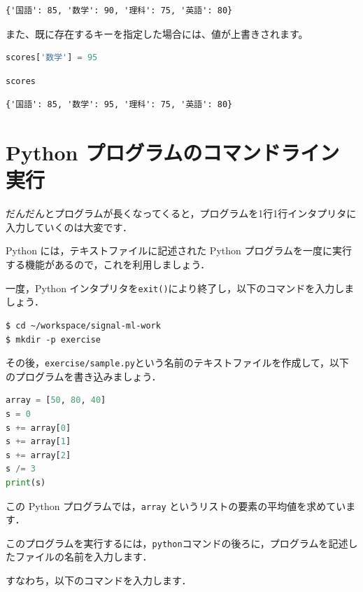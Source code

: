 \begin{lstlisting}[style=outputcell]
{'国語': 85, '数学': 90, '理科': 75, '英語': 80}
\end{lstlisting}

また、既に存在するキーを指定した場合には、値が上書きされます。


\begin{lstlisting}[style=codecell,language=Python]
scores['数学'] = 95
\end{lstlisting}

\begin{lstlisting}[style=codecell,language=Python]
scores
\end{lstlisting}

\begin{lstlisting}[style=outputcell]
{'国語': 85, '数学': 95, '理科': 75, '英語': 80}
\end{lstlisting}

\section{Python プログラムのコマンドライン実行}

だんだんとプログラムが長くなってくると，プログラムを1行1行インタプリタに入力していくのは大変です．

Python には，テキストファイルに記述された Python プログラムを一度に実行する機能があるので，これを利用しましょう．


一度，Python インタプリタを\texttt{exit()}により終了し，以下のコマンドを入力しましょう．

\begin{lstlisting}[style=codecell]
$ cd ~/workspace/signal-ml-work
$ mkdir -p exercise
\end{lstlisting}


その後，\texttt{exercise/sample.py}という名前のテキストファイルを作成して，以下のプログラムを書き込みましょう．


\begin{lstlisting}[style=codecell,language=Python]
array = [50, 80, 40]
s = 0
s += array[0]
s += array[1]
s += array[2]
s /= 3
print(s)
\end{lstlisting}

この Python プログラムでは，\texttt{array} というリストの要素の平均値を求めています．

このプログラムを実行するには，\texttt{python}コマンドの後ろに，プログラムを記述したファイルの名前を入力します．

すなわち，以下のコマンドを入力します．

